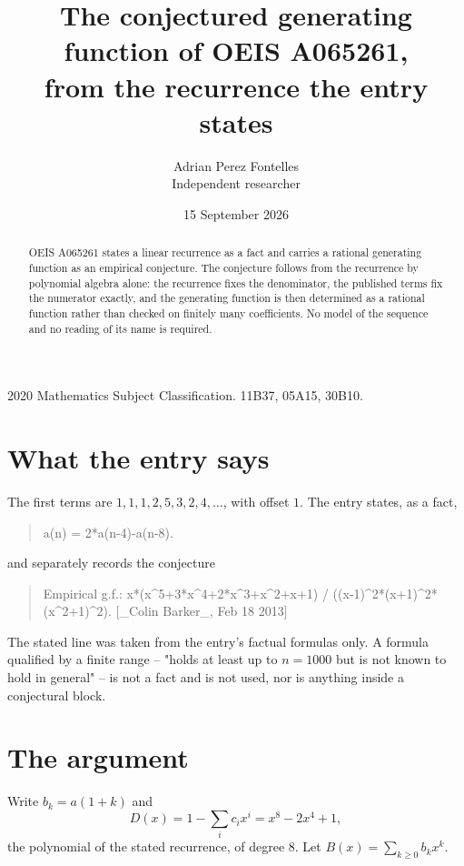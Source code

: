 \documentclass[11pt,a4paper]{article}
\title{The conjectured generating function of OEIS A065261,\\ \large from the recurrence the entry
states}
\author{Adrian Perez Fontelles\\ \small Independent researcher}
\date{15 September 2026}
\theoremstyle{plain}
\theoremstyle{definition}
\begin{document}
\maketitle

\begin{abstract}
OEIS A065261 states a linear recurrence as a fact and carries a rational generating function as an
empirical conjecture. The conjecture follows from the recurrence by polynomial algebra alone:
the recurrence fixes the denominator, the published terms fix the numerator exactly, and the
generating function is then determined as a rational function rather than checked on finitely
many coefficients. No model of the sequence and no reading of its name is required.
\end{abstract}

\noindent\small 2020 Mathematics Subject Classification. 11B37, 05A15, 30B10.\normalsize

\section{What the entry says}

The first terms are $1, 1, 1, 2, 5, 3, 2, 4,\dots$, with offset $1$. The entry states, as a fact,

\begin{quote}\raggedright a(n) = 2*a(n-4)-a(n-8).\end{quote}

\noindent and separately records the conjecture

\begin{quote}\raggedright Empirical g.f.: x*(x\^{}5+3*x\^{}4+2*x\^{}3+x\^{}2+x+1) / ((x-1)\^{}2*(x+1)\^{}2*(x\^{}2+1)\^{}2). [\_Colin Barker\_, Feb 18 2013]\end{quote}

The stated line was taken from the entry's factual formulas only. A formula qualified by a
finite range -- "holds at least up to $n=1000$ but is not known to hold in general" -- is not a
fact and is not used, nor is anything inside a conjectural block.

\section{The argument}

Write $b_k=a(1+k)$ and
\[
  D(x)=1-\sum_{i} c_i x^{i}=x^{8} - 2 x^{4} + 1 ,
\]
the polynomial of the stated recurrence, of degree $8$. Let $B(x)=\sum_{k\ge0}b_kx^k$.
\end{document}
